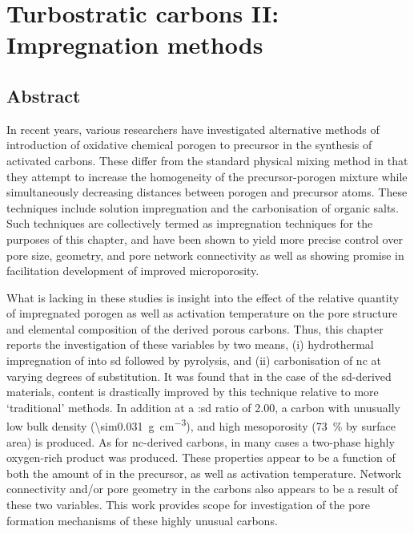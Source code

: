 \chapter{Turbostratic carbons II: Impregnation methods}
\label{ch:impregnation}

\newpage
\section*{Abstract}
In recent years, various researchers have investigated alternative methods of introduction of oxidative chemical \gls{porogen} to precursor in the synthesis of \glspl{activated carbon}. These differ from the standard physical mixing method in that they attempt to increase the homogeneity of the precursor-\gls{porogen} mixture while simultaneously decreasing distances between \gls{porogen} and precursor atoms. These techniques include solution impregnation and the carbonisation of organic salts. Such techniques are collectively termed as impregnation techniques for the purposes of this chapter, and have been shown to yield more precise control over pore size, geometry, and pore network connectivity as well as showing promise in facilitation development of improved microporosity.

What is lacking in these studies is insight into the effect of the relative quantity of impregnated \gls{porogen} as well as activation temperature on the pore structure and elemental composition of the derived porous carbons. Thus, this chapter reports the investigation of these variables by two means, (i) hydrothermal impregnation of  into \acrfull{sd} followed by pyrolysis, and (ii) carbonisation of \acrfull{nc} at varying degrees of substitution. It was found that in the case of the \acrshort{sd}-derived materials,  content is drastically improved by this technique relative to more `traditional' methods. In addition at a :\acrshort{sd} ratio of \num{2.00}, a carbon with unusually low bulk density (\qty{\sim0.031}{\gram\per\cm\cubed}),  and high mesoporosity (\qty{73}{\percent} by surface area) is produced. As for \acrshort{nc}-derived carbons, in many cases a two-phase highly oxygen-rich product was produced. These properties appear to be a function of both the amount of  in the precursor, as well as activation temperature. Network connectivity and/or pore geometry in the carbons also appears to be a result of these two variables. This work provides scope for investigation of the pore formation mechanisms of these highly unusual carbons.

